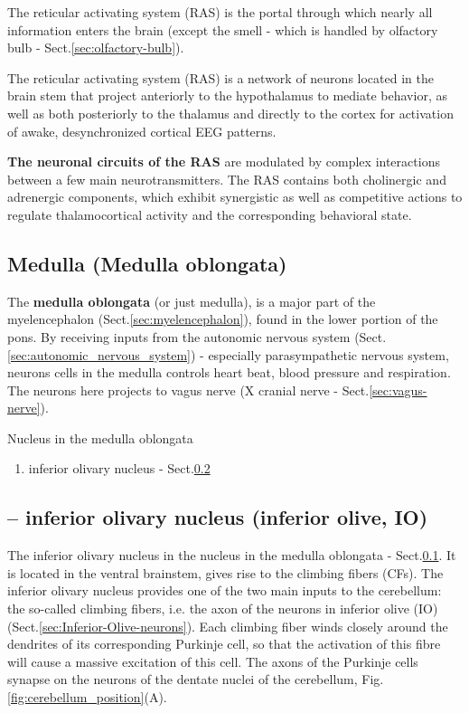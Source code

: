 The reticular activating system (RAS) is the portal through which nearly all
information enters the brain (except the smell - which is handled by olfactory
bulb - Sect.\ref{sec:olfactory-bulb}).

The reticular activating system (RAS) is a network of neurons located in the
brain stem that project anteriorly to the hypothalamus to mediate behavior, as
well as both posteriorly to the thalamus and directly to the cortex for
activation of awake, desynchronized cortical EEG patterns.   


{\bf The neuronal circuits of the RAS} are modulated by complex interactions
between a few main neurotransmitters. The RAS contains both cholinergic and
adrenergic components, which exhibit synergistic as well as competitive actions
to regulate thalamocortical activity and the corresponding behavioral state.


\subsection{Medulla (Medulla oblongata)}
\label{sec:medulla_oblongata}

The {\bf medulla oblongata} (or just medulla), is a major part of the
myelencephalon (Sect.\ref{sec:myelencephalon}), found in the lower portion of
the pons. By receiving inputs from the autonomic nervous system
(Sect.\ref{sec:autonomic_nervous_system}) - especially parasympathetic nervous
system, neurons cells in the medulla controls heart beat, blood pressure and
respiration. The neurons here projects to vagus nerve (X cranial nerve -
Sect.\ref{sec:vagus-nerve}).

Nucleus in the medulla oblongata
\begin{enumerate}
  \item inferior olivary nucleus - Sect.\ref{sec:inferior-olive-nucleus}
\end{enumerate}


\subsection{-- inferior olivary nucleus (inferior olive, IO)}
\label{sec:inferior-olive-nucleus}

The inferior olivary nucleus in the nucleus in the medulla oblongata -
Sect.\ref{sec:medulla_oblongata}. It is located in the ventral brainstem, gives
rise to the climbing fibers (CFs). The inferior olivary nucleus provides one of
the two main inputs to the cerebellum: the so-called climbing fibers, i.e. the
axon of the neurons in inferior olive
(IO) (Sect.\ref{sec:Inferior-Olive-neurons}).
Each climbing fiber winds closely around the dendrites of its corresponding
Purkinje cell, so that the activation of this fibre will cause a massive
excitation of this cell.
The axons of the Purkinje cells synapse on the neurons of the dentate nuclei of
the cerebellum, Fig.\ref{fig:cerebellum_position}(A).


